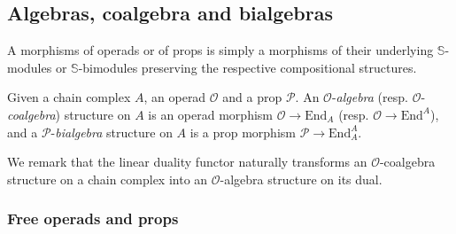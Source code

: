 \documentclass{amsart}
\renewcommand{\S}{\mathbb{S}}
\newcommand{\End}{\mathrm{End}}
\newtheorem{definition}[theorem]{Definition}
\begin{document}
%

\subsection{Algebras, coalgebra and bialgebras}

A morphisms of operads or of props is simply a morphisms of their underlying $\S$-modules or $\S$-bimodules preserving the respective compositional structures.

Given a chain complex $A$, an operad $\mathcal O$ and a prop $\mathcal P$. An $\mathcal O$-\textit{algebra} (resp. $\mathcal O$-\textit{coalgebra}) structure on $A$ is an operad morphism $\mathcal O \to \End_A$ (resp. $\mathcal O \to \End^A$), and a $\mathcal P$-\textit{bialgebra} structure on $A$ is a prop morphism $\mathcal P \to \End_A^A$.

We remark that the linear duality functor naturally transforms an $\mathcal O$-coalgebra structure on a chain complex into an $\mathcal O$-algebra structure on its dual.


\subsubsection{Free operads and props}
\end{document}
